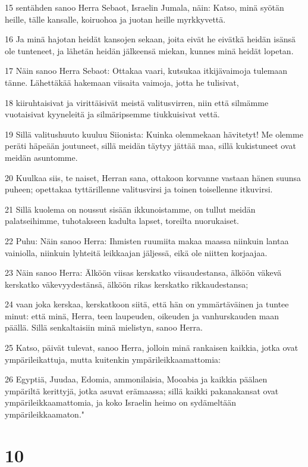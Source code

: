 \par 15 sentähden sanoo Herra Sebaot, Israelin Jumala, näin: Katso, minä syötän heille, tälle kansalle, koiruohoa ja juotan heille myrkkyvettä.
\par 16 Ja minä hajotan heidät kansojen sekaan, joita eivät he eivätkä heidän isänsä ole tunteneet, ja lähetän heidän jälkeensä miekan, kunnes minä heidät lopetan.
\par 17 Näin sanoo Herra Sebaot: Ottakaa vaari, kutsukaa itkijävaimoja tulemaan tänne. Lähettäkää hakemaan viisaita vaimoja, jotta he tulisivat,
\par 18 kiiruhtaisivat ja virittäisivät meistä valitusvirren, niin että silmämme vuotaisivat kyyneleitä ja silmäripsemme tiukkuisivat vettä.
\par 19 Sillä valitushuuto kuuluu Siionista: Kuinka olemmekaan hävitetyt! Me olemme peräti häpeään joutuneet, sillä meidän täytyy jättää maa, sillä kukistuneet ovat meidän asuntomme.
\par 20 Kuulkaa siis, te naiset, Herran sana, ottakoon korvanne vastaan hänen suunsa puheen; opettakaa tyttärillenne valitusvirsi ja toinen toisellenne itkuvirsi.
\par 21 Sillä kuolema on noussut sisään ikkunoistamme, on tullut meidän palatseihimme, tuhotakseen kadulta lapset, toreilta nuorukaiset.
\par 22 Puhu: Näin sanoo Herra: Ihmisten ruumiita makaa maassa niinkuin lantaa vainiolla, niinkuin lyhteitä leikkaajan jäljessä, eikä ole niitten korjaajaa.
\par 23 Näin sanoo Herra: Älköön viisas kerskatko viisaudestansa, älköön väkevä kerskatko väkevyydestänsä, älköön rikas kerskatko rikkaudestansa;
\par 24 vaan joka kerskaa, kerskatkoon siitä, että hän on ymmärtäväinen ja tuntee minut: että minä, Herra, teen laupeuden, oikeuden ja vanhurskauden maan päällä. Sillä senkaltaisiin minä mielistyn, sanoo Herra.
\par 25 Katso, päivät tulevat, sanoo Herra, jolloin minä rankaisen kaikkia, jotka ovat ympärileikattuja, mutta kuitenkin ympärileikkaamattomia:
\par 26 Egyptiä, Juudaa, Edomia, ammonilaisia, Mooabia ja kaikkia päälaen ympäriltä kerittyjä, jotka asuvat erämaassa; sillä kaikki pakanakansat ovat ympärileikkaamattomia, ja koko Israelin heimo on sydämeltään ympärileikkaamaton."

\chapter{10}

